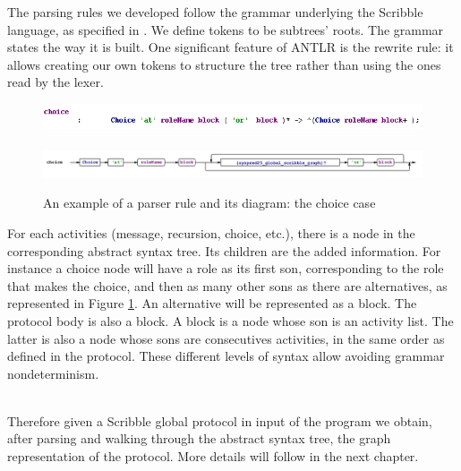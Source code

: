 \documentclass[a4paper,11pt,twoside]{report}
\begin{document}
The parsing rules we developed follow the grammar underlying the Scribble language, as specified in \cite{scribblelanguage}. We define tokens to be subtrees' roots. The grammar states the way it is built. One significant feature of ANTLR is the rewrite rule: it allows creating our own tokens to structure the tree rather than using the ones read by the lexer.

\begin{figure}[h]
\begin{center}
\includegraphics{choicerule2}
~~\\
\includegraphics[scale=0.5]{choicerule}
\end{center}
\caption{An example of a parser rule and its diagram: the choice case}
\label{fig:choicerule}
\end{figure}
For each activities (message, recursion, choice, etc.), there is a node in the corresponding abstract syntax tree. Its children are the added information. For instance a choice node will have a role as its first son, corresponding to the role that makes the choice, and then as many other sons as there are alternatives, as represented in Figure \ref{fig:choicerule}. An alternative will be represented as a block. The protocol body is also a block. A block is a node whose son is an activity list. The latter is also a node whose sons are consecutives activities, in the same order as defined in the protocol. These different levels of syntax allow avoiding grammar nondeterminism.


~~\\

Therefore given a Scribble global protocol in input of the program we obtain, after parsing and walking through the abstract syntax tree, the graph representation of the protocol. More details will follow in the next chapter.
\end{document}
